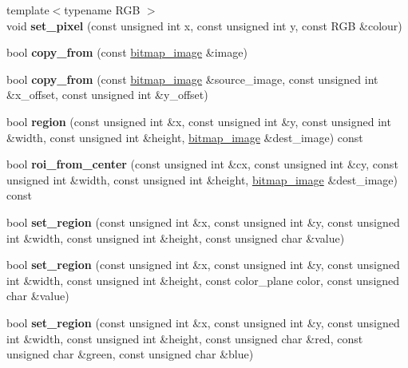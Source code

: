 \begin{DoxyCompactItemize}
{\footnotesize template$<$typename R\+GB $>$ }\\void {\bfseries set\+\_\+pixel} (const unsigned int x, const unsigned int y, const R\+GB \&colour)
\item 
\mbox{\label{classbitmap__image_ab3420ee9edc96bef02d68364ae121361}} 
bool {\bfseries copy\+\_\+from} (const \mbox{\hyperlink{classbitmap__image}{bitmap\+\_\+image}} \&image)
\item 
\mbox{\label{classbitmap__image_a1ea432d59b84bedf41b2d07dbcb2e010}} 
bool {\bfseries copy\+\_\+from} (const \mbox{\hyperlink{classbitmap__image}{bitmap\+\_\+image}} \&source\+\_\+image, const unsigned int \&x\+\_\+offset, const unsigned int \&y\+\_\+offset)
\item 
\mbox{\label{classbitmap__image_a8598106aa98fa79b89843a31f09fc9a1}} 
bool {\bfseries region} (const unsigned int \&x, const unsigned int \&y, const unsigned int \&width, const unsigned int \&height, \mbox{\hyperlink{classbitmap__image}{bitmap\+\_\+image}} \&dest\+\_\+image) const
\item 
\mbox{\label{classbitmap__image_abf307f8a4a889e293de00a2ae8bdaabc}} 
bool {\bfseries roi\+\_\+from\+\_\+center} (const unsigned int \&cx, const unsigned int \&cy, const unsigned int \&width, const unsigned int \&height, \mbox{\hyperlink{classbitmap__image}{bitmap\+\_\+image}} \&dest\+\_\+image) const
\item 
\mbox{\label{classbitmap__image_ac541eb6e1fe26f9d63a3b452c8f7c6cc}} 
bool {\bfseries set\+\_\+region} (const unsigned int \&x, const unsigned int \&y, const unsigned int \&width, const unsigned int \&height, const unsigned char \&value)
\item 
\mbox{\label{classbitmap__image_af929bd2c9cfa45ce6fa4adf2803730b8}} 
bool {\bfseries set\+\_\+region} (const unsigned int \&x, const unsigned int \&y, const unsigned int \&width, const unsigned int \&height, const color\+\_\+plane color, const unsigned char \&value)
\item 
\mbox{\label{classbitmap__image_ad5d5ffa6346a08edc4142a182d4d5d9e}} 
bool {\bfseries set\+\_\+region} (const unsigned int \&x, const unsigned int \&y, const unsigned int \&width, const unsigned int \&height, const unsigned char \&red, const unsigned char \&green, const unsigned char \&blue)

\end{DoxyCompactItemize}
